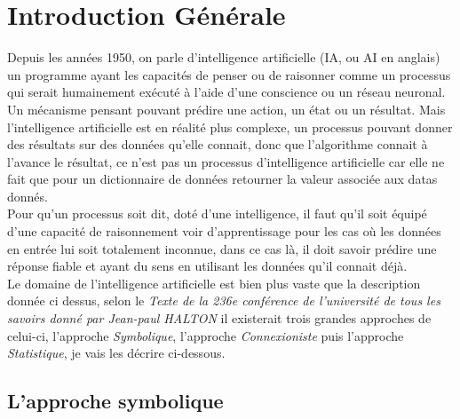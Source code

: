 \chapter{Introduction Générale}
\pagebreak

Depuis les années 1950, on parle d'intelligence artificielle (IA, ou AI en anglais) un programme ayant les capacités de penser ou de raisonner comme un processus qui serait humainement exécuté à l'aide d'une conscience ou un réseau neuronal. Un mécanisme pensant pouvant prédire une action, un état ou un résultat. Mais l'intelligence artificielle est en réalité plus complexe, un processus pouvant donner des résultats sur des données qu'elle connait, donc que l'algorithme connait à l'avance le résultat, ce n'est pas un processus d'intelligence artificielle car elle ne fait que pour un dictionnaire de données retourner la valeur associée aux datas donnés. \\
Pour qu'un processus soit dit, doté d'une intelligence, il faut qu'il soit équipé d'une capacité de raisonnement voir d'apprentissage pour les cas où les données en entrée lui soit totalement inconnue, dans ce cas là, il doit savoir prédire une réponse fiable et ayant du sens en utilisant les données qu'il connait déjà.\\
\linebreak
Le domaine de l'intelligence artificielle est bien plus vaste que la description donnée ci dessus, selon le \textit{Texte de la 236e conférence de l'université de tous les savoirs donné par Jean-paul HALTON} il existerait trois grandes approches de celui-ci, l'approche \emph{Symbolique}, l'approche \emph{Connexioniste} puis l'approche \emph{Statistique}, je vais les décrire ci-dessous.

\pagebreak
\section{L'approche symbolique}


